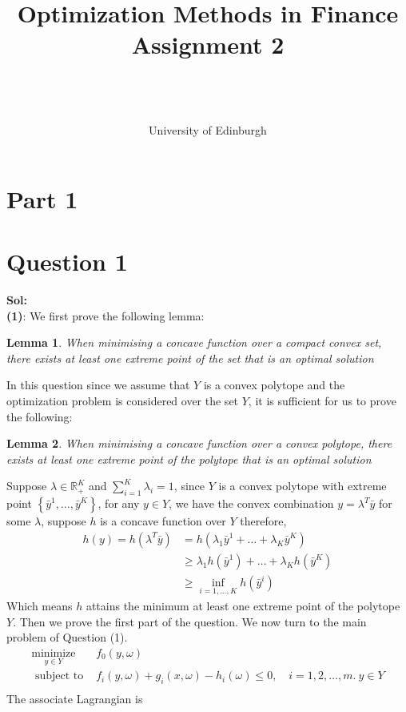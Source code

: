 \documentclass[11pt,a4paper]{article}
\title{Optimization Methods in Finance \\ Assignment 2}
\author{\StudentName\\ \StudentNumber \\ \phantom{} \\ University of Edinburgh }
\date{}
\newtheorem*{lem}{Lemma}
\begin{document}
\maketitle
\section*{Part 1 }
\section*{Question 1}
\textbf{Sol:}\\
\textbf{(1)}:
We first prove the following lemma:
\begin{lem}
	\textit{When minimising a concave function over a compact convex set, there exists at
		least one extreme point of the set that is an optimal solution}
\end{lem}
In this question since we assume that $Y$ is a convex polytope and the optimization problem is considered over the set $Y$, it is sufficient for us to prove the following:
\begin{lem}
	\textit{When minimising a concave function over a convex polytope, there exists at
least one extreme point of the polytope that is an optimal solution}
\end{lem}
Suppose $\lambda \in \mathbb{R}_{+}^{K}$ and $\sum_{i=1}^{K}\lambda_{i}=1$, since $Y$ is a convex polytope with extreme point $\left\{\bar{y}^{1}, \ldots, \bar{y}^{K}\right\}$, for any $y\in Y$, we have the convex combination $y=\lambda^{T}\bar{y}$ for some $\lambda$, suppose $h$ is a concave function over $Y$ therefore,
$$\begin{aligned}h(y) = h(\lambda^{T}\bar{y})&=h(\lambda_{1}\bar{y}^{1}+ \ldots+\lambda_{K}\bar{y}^{K})\\
&\geq \lambda_{1}h(\bar{y}^{1})+\ldots+\lambda_{K}h(\bar{y}^{K})\\
&\geq \inf_{i = 1,\ldots,K}h(\bar{y}^{i})
\end{aligned}$$
Which means $h$ attains the minimum at least one extreme point of the polytope $Y$.
Then we prove the first part of the question. We now turn to the main problem of Question (1).
$$\begin{array}{ll}
\underset{y\in Y}{\operatorname{minimize}} 
& f_{0}(y,\omega) \\ \text { subject to }
& f_{i}(y,\omega)+g_{i}(x,\omega)-h_{i}(\omega)\leq0, \quad i=1,2, \ldots, m. \ y\in Y \\ 
\end{array}$$
The associate Lagrangian is 
\end{document}
